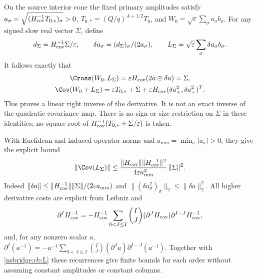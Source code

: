 On the source interior cone the fixed primary amplitudes satisfy
$a_\sigma=\sqrt{(H_{\rm cov}^{-1}T_{0,*})_\sigma}>0$,
$T_{0,*}=(Q/q)^{A+1/2}T_0$, and
$W_0=\sqrt\varepsilon\sum_\sigma a_\sigma b_\sigma$.
For any signed slow real vector $\Sigma$, define
\begin{equation}
 d_\Sigma=H_{\rm cov}^{-1}\Sigma/\varepsilon,\qquad
 \delta a_\sigma=(d_\Sigma)_\sigma/(2a_\sigma),\qquad
 L_\Sigma=\sqrt\varepsilon\sum_\sigma\delta a_\sigma b_\sigma .
 \label{nsbridge:cb:L}
\end{equation}
It follows exactly that
\begin{gather}
 \Cross(W_0,L_\Sigma)=\varepsilon H_{\rm cov}(2a\odot\delta a)=\Sigma,
 \label{nsbridge:cb:inverse}\\
 \Cov(W_0+L_\Sigma)
   =\varepsilon T_{0,*}+\Sigma+
       \varepsilon H_{\rm cov}(\delta a_+^2,\delta a_-^2)^T.
 \label{nsbridge:cb:quad}
\end{gather}
This proves a linear right inverse of the derivative. It is not an
exact inverse of the quadratic covariance map. There is no sign or
size restriction on $\Sigma$ in these identities; no square root of
$H_{\rm cov}^{-1}(T_{0,*}+\Sigma/\varepsilon)$ is taken.

With Euclidean and induced operator norms and
$a_{\min}=\min_\sigma|a_\sigma|>0$, they give the explicit bound
\begin{equation}
 \|\Cov(L_\Sigma)\|\le
 \frac{\|H_{\rm cov}\|\|H_{\rm cov}^{-1}\|^2}
              {4\varepsilon a_{\min}^2}\,\|\Sigma\|^2. \label{nsbridge:cb:bound}
\end{equation}
Indeed $\|\delta a\|\le\|H_{\rm cov}^{-1}\|\|\Sigma\|/
(2\varepsilon a_{\min})$ and
$\|(\delta a_\sigma^2)_\sigma\|_2\le\|\delta a\|_2^2$.
All higher derivative costs are explicit from Leibniz and
\[
 \partial^I H_{\rm cov}^{-1}
 =-H_{\rm cov}^{-1}
 \sum_{0<J\le I}\binom{I}{J}(\partial^JH_{\rm cov})
                           \partial^{I-J}H_{\rm cov}^{-1},
\]
and, for any nonzero scalar $a$,
$\partial^I(a^{-1})=-a^{-1}\sum_{0<J\le I}\binom{I}{J}
(\partial^Ja)\partial^{I-J}(a^{-1})$.
Together with \eqref{nsbridge:cb:L} these recurrences give finite bounds for
each order without assuming constant amplitudes or constant columns.

